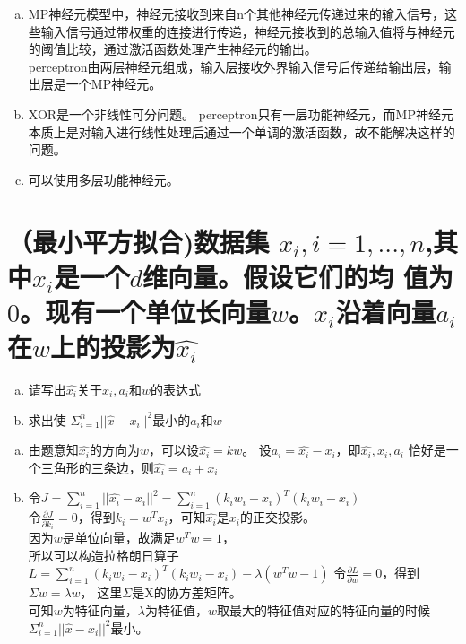 \documentclass[11pt]{article}
\newenvironment{answer}{\par\color{MidnightBlue}}{\par}
\begin{document}
\begin{answer}
\begin{enumerate}[(a)]
    \item MP神经元模型中，神经元接收到来自n个其他神经元传递过来的输入信号，这些输入信号通过带权重的连接进行传递，神经元接收到的总输入值将与神经元的阈值比较，通过激活函数处理产生神经元的输出。 \\
    perceptron由两层神经元组成，输入层接收外界输入信号后传递给输出层，输出层是一个MP神经元。
    \item XOR是一个非线性可分问题。 perceptron只有一层功能神经元，而MP神经元本质上是对输入进行线性处理后通过一个单调的激活函数，故不能解决这样的问题。
    \item 可以使用多层功能神经元。
\end{enumerate}
\end{answer}

\section{（最小平方拟合)数据集 ${x_i}, i = 1,..., n$,其中$x_i$是一个$d$维向量。假设它们的均
值为$0$。现有一个单位长向量$w$。$x_i$沿着向量$a_i$在$w$上的投影为$\hat{x_i}$}
\begin{enumerate}[(a)]
    \item 请写出$\hat{x_i}$关于$x_i, a_i$和$w$的表达式
    \item 求出使 $\Sigma_{i=1}^n||\hat{x}-x_i||^2$最小的$a_i$和$w$
\end{enumerate}

\begin{answer}
\begin{enumerate}[(a)]
    \item 由题意知$\hat{x_i}$的方向为$w$，可以设$\hat{x_i}=kw$。
    设$a_i = \hat{x_i} - x_i$，即$\hat{x_i}, x_i, a_i$ 恰好是一个三角形的三条边，则$\hat{x_i} = a_i + x_i$
    \item 令$J = \sum_{i=1}^n||\hat{x_i} - x_i||^2 = \sum_{i=1}^n(k_i w_i-x_i)^T(k_i w_i-x_i)$ \\
        令$\frac{\partial J}{\partial k_i} = 0$，得到$k_i=w^Tx_i$，可知$\hat{x_i}$是$x_i$的正交投影。\\
        因为$w$是单位向量，故满足$w^Tw=1$，\\
        所以可以构造拉格朗日算子$L = \sum_{i=1}^n(k_i w_i-x_i)^T(k_i w_i-x_i) - \lambda(w^Tw-1)$
        令$\frac{\partial L}{\partial w} = 0$，得到$\Sigma w = \lambda w$， 这里$\Sigma$是X的协方差矩阵。\\
        可知$w$为特征向量，$\lambda$为特征值，$w$取最大的特征值对应的特征向量的时候$\Sigma_{i=1}^n||\hat{x}-x_i||^2$最小。
\end{enumerate}
\end{answer}
\end{document}
